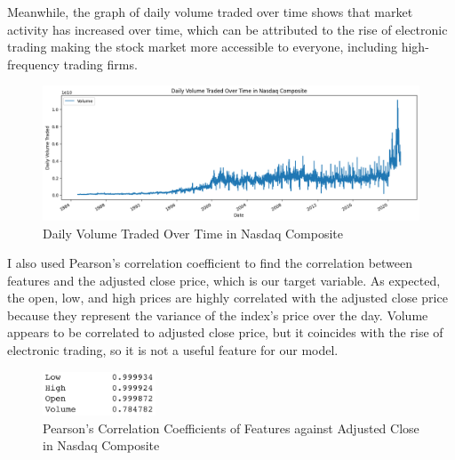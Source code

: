 \documentclass[a4paper, 11pt]{article}
\begin{document}
Meanwhile, the graph of daily volume traded over time shows that market activity has increased over time, which can be attributed to the rise of electronic trading making the stock market more accessible to everyone, including high-frequency trading firms.

\begin{figure}[H]
    \begin{center}
        \includegraphics[width=1\textwidth]{Daily Volume Traded Over Time in Nasdaq Composite.png}
        \caption{Daily Volume Traded Over Time in Nasdaq Composite}
    \end{center}
\end{figure}

I also used Pearson's correlation coefficient to find the correlation between features and the adjusted close price, which is our target variable. As expected, the open, low, and high prices are highly correlated with the adjusted close price because they represent the variance of the index's price over the day. Volume appears to be correlated to adjusted close price, but it coincides with the rise of electronic trading, so it is not a useful feature for our model.

\begin{figure}[H]
    \begin{center}
        \includegraphics[width=0.3\textwidth]{Pearson's Correlation Coefficients.png}
        \caption{Pearson's Correlation Coefficients of Features against Adjusted Close in Nasdaq Composite}
    \end{center}
\end{figure}
\end{document}
